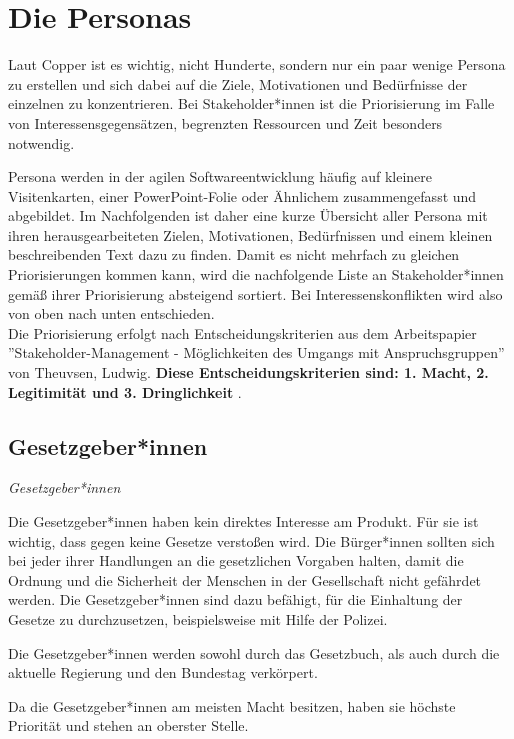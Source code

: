 \documentclass[paper=a4, parskip=half]{scrreprt}
\begin{document}
\newpage
\section{Die Personas}
Laut Copper ist es wichtig, nicht Hunderte, sondern nur ein paar wenige Persona zu erstellen und sich dabei auf die Ziele, Motivationen und Bedürfnisse der einzelnen zu konzentrieren. Bei Stakeholder*innen ist die Priorisierung im Falle von Interessensgegensätzen, begrenzten Ressourcen und Zeit besonders notwendig.

Persona werden in der agilen Softwareentwicklung häufig auf kleinere Visitenkarten, einer PowerPoint-Folie oder Ähnlichem zusammengefasst und abgebildet. Im Nachfolgenden ist daher eine kurze Übersicht aller Persona mit ihren herausgearbeiteten Zielen, Motivationen, Bedürfnissen und einem kleinen beschreibenden Text dazu zu finden. Damit es nicht mehrfach zu gleichen Priorisierungen kommen kann, wird die nachfolgende Liste an Stakeholder*innen gemäß ihrer Priorisierung absteigend sortiert. Bei Interessenskonflikten wird also von oben nach unten entschieden.\\
Die Priorisierung erfolgt nach Entscheidungskriterien aus dem Arbeitspapier ''Stakeholder-Management - Möglichkeiten des Umgangs mit Anspruchsgruppen'' von Theuvsen, Ludwig. \textbf{Diese Entscheidungskriterien sind: 1. Macht, 2. Legitimität und 3. Dringlichkeit} \cite{Theuvsen2001}.

\subsection{Gesetzgeber*innen}
\vspace{-0.5cm}\textit{Gesetzgeber*innen}

Die Gesetzgeber*innen haben kein direktes Interesse am Produkt. Für sie ist wichtig, dass gegen keine Gesetze verstoßen wird. Die Bürger*innen sollten sich bei jeder ihrer Handlungen an die gesetzlichen Vorgaben halten, damit die Ordnung und die Sicherheit der Menschen in der Gesellschaft nicht gefährdet werden. Die Gesetzgeber*innen sind dazu befähigt, für die Einhaltung der Gesetze zu durchzusetzen, beispielsweise mit Hilfe der Polizei.

Die Gesetzgeber*innen werden sowohl durch das Gesetzbuch, als auch durch die aktuelle Regierung und den Bundestag verkörpert.

Da die Gesetzgeber*innen am meisten Macht besitzen, haben sie höchste Priorität und stehen an oberster Stelle.

\vspace{0.5cm}
\end{document}
